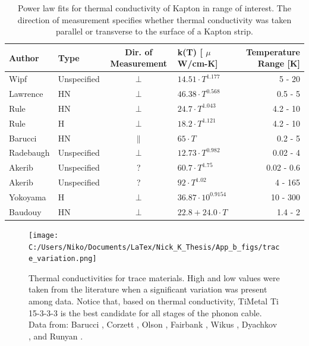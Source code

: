 \documentclass{report}
\begin{document}
\begin{table}[h]
\centering
{}
\begin{threeparttable}
\begin{tabular}{llclr}
\toprule
Author & Type & Dir. of Measurement & k(T) [ $\mu$W/cm-K] & Temperature Range [K]\\
\midrule
Wipf \cite{wip} & Unspecified & $\perp$ & $14.51 \cdot T^{1.177}$ & 5 - 20 \\
Lawrence \cite{law} & HN & $\perp$ & $46.38 \cdot T^{0.568}$ & 0.5 - 5 \\
Rule \cite{Rule1996} & HN & $\perp$ & $24.7 \cdot T^{1.043}$ & 4.2 - 10 \\
Rule \cite{Rule1996} & H & $\perp$ & $18.2 \cdot T^{1.121}$ & 4.2 - 10 \\
Barucci \cite{bar} & HN & $\parallel$ & $65 \cdot T$ & 0.2 - 5 \\
Radebaugh \cite{rad73} & Unspecified & $\perp$ & $12.73 \cdot T^{0.982}$ & 0.02 - 4 \\
Akerib \cite{Akerib} & Unspecified & ? & $60.7 \cdot T^{1.75}$ & 0.02 - 0.6  \\
Akerib \cite{Akerib}& Unspecified & ? & $92 \cdot T^{1.02}$ & 4 - 165 \\
Yokoyama \cite{yok} & H & $\perp$ & $36.87 \cdot 10^{0.9154}$ & 10 - 300 \\
Baudouy \cite{Baudouy2003} & HN & $\perp$ & $22.8 + 24.0 \cdot T$ & 1.4 - 2 \\
\bottomrule
\end{tabular}
\caption{Power law fits for thermal conductivity of Kapton in range of interest. The direction of measurement specifies whether thermal conductivity was taken parallel or transverse to the surface of a Kapton strip.}
\end{threeparttable}
\end{table}

\begin{figure}[h]
\centering
\texttt{[image: C:/Users/Niko/Documents/LaTex/Nick\_K\_Thesis/App\_b\_figs/trace\_variation.png]}
\caption{Thermal conductivities for trace materials. High and low values were taken from the literature when a significant variation was present among data. Notice that, based on thermal conductivity, TiMetal Ti 15-3-3-3 is the best candidate for all stages of the phonon cable. Data from: Barucci \cite{Barucci2008}, Corzett \cite{cor}, Olson \cite{ols}, Fairbank \cite{fair}, Wikus \cite{wik}, Dyachkov \cite{dya}, and Runyan \cite{run}.}
\end{figure}
\end{document}

